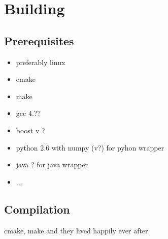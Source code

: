 \chapter{Building}
\section{Prerequisites}
\begin{itemize}
\item preferably linux
\item cmake
\item make
\item gcc 4.??
\item boost v ?
\item python 2.6 with numpy (v?) for pyhon wrapper
\item java ? for java wrapper
\item ...
\end{itemize}
\section{Compilation}
cmake, make and they lived happily ever after

